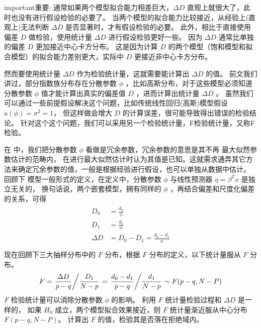 \documentclass[letterpaper,10pt,english]{sphinxmanual}
\begin{document}
\begin{sphinxadmonition}{important}{重要:}
通常如果两个模型拟合能力相差巨大，\(\Delta D\) 直观上就很大了，此时也没有进行假设检验的必要了。
当两个模型的拟合能力比较接近，从经验上(直观上)无法判断 \(\Delta D\) 是否显著时，才有假设检验的必要。
此外，相比于直接使用偏差 \(D\) 做检验，使用统计量 \(\Delta D\) 进行假设检验更好一些。
因为 \(\Delta D\) 通常比单独的偏差 \(D\) 更加接近中心卡方分布。
这是因为计算 \(D\) 的两个模型（饱和模型和拟合模型）的拟合能力差别更大，实际中 \(D\) 更接近非中心卡方分布。
\end{sphinxadmonition}

然而要使用统计量 \(\Delta D\) 作为检验统计量，这就需要能计算出 \(\Delta D\) 的值。
前文我们讲过，部分指数族分布存在分散参数 \(\phi\) ，比如高斯分布，对于这些模型必须知道分散参数 \(\phi\)
值才能计算出真实的偏差值 \(D\) ，进而计算出统计量 \(\Delta D\) 。
虽然我们可以通过一些前提假设解决这个问题，比如传统线性回归(高斯)模型假设 \(a(\phi)=\sigma^2=1\)，
但这样做会增大 \(D\) 的计算误差，很可能导致得出错误的检验结论。
针对这个这个问题，我们可以采用另一个检验统计量，F检验统计量，又称F检验。

在  中，我们把分散参数 \(\phi\) 看做是冗余参数，冗余参数的意思是其不再  最大似然参数估计的范畴内，
在进行最大似然估计时认为其值是已知。这就需求通弄其它方法来确定冗余参数的值，一般是根据经验进行假设，也可以单独从数据中估计。
回顾下  模型一般形式的定义，在定义中，分散参数 \(\phi\) 与线性预测器 \(\eta=\beta^T x\) 是独立无关的，
换句话说，两个嵌套模型，拥有同样的 \(\phi\) ，再结合偏差和尺度化偏差的关系，可得
\begin{align}\label{equation:模型评估/influence:模型评估/influence:44}\!\begin{aligned}
D_0 &= \frac{d_0}{\phi}\\
D_1 &= \frac{d_1}{\phi}\\
\Delta D &=  D_0 - D_1 = \frac{d_0-d_1}{\phi}\\
\end{aligned}\end{align}
现在回顾下三大抽样分布中的 \(F\) 分布，根据 \(F\) 分布的定义，以下统计量服从 \(F\) 分布。
\begin{equation}\label{equation:模型评估/influence:模型评估/influence:45}
\begin{split}F = \left. \frac{\Delta D}{p-q} \middle/ \frac{D_1}{N-p} \right.
= \left. \frac{d_0 - d_1}{p-q} \middle/ \frac{d_1}{N-p} \right.
\sim F(p-q,N-P)\end{split}
\end{equation}
\(F\) 检验统计量可以消除分散参数 \(\phi\) 的影响。
利用 \(F\) 统计量检验过程和 \(\Delta D\) 是一样的，
如果 \(H_0\) 成立，两个模型拟合效果接近，则 \(F\) 统计量渐近服从中心分布 \(F(p-q,N-P)\)。
计算出 \(F\) 的值，检验其是否落在拒绝域内。
\end{document}
